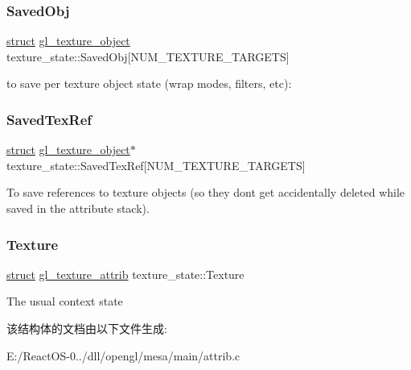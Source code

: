 \subsubsection{\texorpdfstring{Saved\+Obj}{SavedObj}}
{\footnotesize\ttfamily \hyperlink{interfacestruct}{struct} \hyperlink{structgl__texture__object}{gl\+\_\+texture\+\_\+object} texture\+\_\+state\+::\+Saved\+Obj\mbox{[}N\+U\+M\+\_\+\+T\+E\+X\+T\+U\+R\+E\+\_\+\+T\+A\+R\+G\+E\+TS\mbox{]}}

to save per texture object state (wrap modes, filters, etc)\+: \mbox{\label{structtexture__state_ac3d2463544a34245ad079ad67cc80979}} 
\subsubsection{\texorpdfstring{Saved\+Tex\+Ref}{SavedTexRef}}
{\footnotesize\ttfamily \hyperlink{interfacestruct}{struct} \hyperlink{structgl__texture__object}{gl\+\_\+texture\+\_\+object}$\ast$ texture\+\_\+state\+::\+Saved\+Tex\+Ref\mbox{[}N\+U\+M\+\_\+\+T\+E\+X\+T\+U\+R\+E\+\_\+\+T\+A\+R\+G\+E\+TS\mbox{]}}

To save references to texture objects (so they don\textquotesingle{}t get accidentally deleted while saved in the attribute stack). \mbox{\label{structtexture__state_a68291c6540890e8155771cb8f35cfea7}} 
\subsubsection{\texorpdfstring{Texture}{Texture}}
{\footnotesize\ttfamily \hyperlink{interfacestruct}{struct} \hyperlink{structgl__texture__attrib}{gl\+\_\+texture\+\_\+attrib} texture\+\_\+state\+::\+Texture}

The usual context state 

该结构体的文档由以下文件生成\+:\begin{DoxyCompactItemize}
\item 
E\+:/\+React\+O\+S-\/0../dll/opengl/mesa/main/attrib.\+c\end{DoxyCompactItemize}
